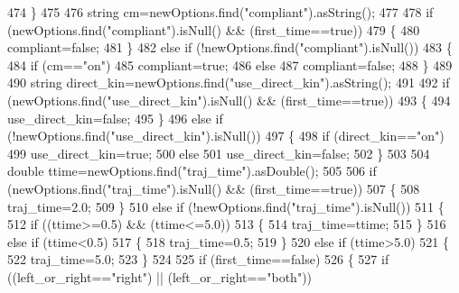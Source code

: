 \begin{DoxyCode}
474     \}
475 
476     \textcolor{keywordtype}{string} cm=newOptions.find(\textcolor{stringliteral}{"compliant"}).asString();
477 
478     \textcolor{keywordflow}{if} (newOptions.find(\textcolor{stringliteral}{"compliant"}).isNull() && (first\_time==\textcolor{keyword}{true}))
479     \{
480         compliant=\textcolor{keyword}{false};
481     \}
482     \textcolor{keywordflow}{else} \textcolor{keywordflow}{if} (!newOptions.find(\textcolor{stringliteral}{"compliant"}).isNull())
483     \{
484         \textcolor{keywordflow}{if} (cm==\textcolor{stringliteral}{"on"})
485             compliant=\textcolor{keyword}{true};
486         \textcolor{keywordflow}{else}
487             compliant=\textcolor{keyword}{false};
488     \}
489 
490     \textcolor{keywordtype}{string} direct\_kin=newOptions.find(\textcolor{stringliteral}{"use\_direct\_kin"}).asString();
491 
492     \textcolor{keywordflow}{if} (newOptions.find(\textcolor{stringliteral}{"use\_direct\_kin"}).isNull() && (first\_time==\textcolor{keyword}{true}))
493     \{
494         use_direct_kin=\textcolor{keyword}{false};
495     \}
496     \textcolor{keywordflow}{else} \textcolor{keywordflow}{if} (!newOptions.find(\textcolor{stringliteral}{"use\_direct\_kin"}).isNull())
497     \{
498         \textcolor{keywordflow}{if} (direct\_kin==\textcolor{stringliteral}{"on"})
499             use_direct_kin=\textcolor{keyword}{true};
500         \textcolor{keywordflow}{else}
501             use_direct_kin=\textcolor{keyword}{false};
502     \}
503 
504     \textcolor{keywordtype}{double} ttime=newOptions.find(\textcolor{stringliteral}{"traj\_time"}).asDouble();
505 
506     \textcolor{keywordflow}{if} (newOptions.find(\textcolor{stringliteral}{"traj\_time"}).isNull() && (first\_time==\textcolor{keyword}{true}))
507     \{
508         traj_time=2.0;
509     \}
510     \textcolor{keywordflow}{else} \textcolor{keywordflow}{if} (!newOptions.find(\textcolor{stringliteral}{"traj\_time"}).isNull())
511     \{
512         \textcolor{keywordflow}{if} ((ttime>=0.5) && (ttime<=5.0))
513         \{
514             traj_time=ttime;
515         \}
516         \textcolor{keywordflow}{else} \textcolor{keywordflow}{if} (ttime<0.5)
517         \{
518             traj_time=0.5;
519         \}
520         \textcolor{keywordflow}{else} \textcolor{keywordflow}{if} (ttime>5.0)
521         \{
522             traj_time=5.0;
523         \}
524 
525         \textcolor{keywordflow}{if} (first\_time==\textcolor{keyword}{false})
526         \{
527             \textcolor{keywordflow}{if} ((left_or_right==\textcolor{stringliteral}{"right"}) || (left_or_right==\textcolor{stringliteral}{"both"}))

\end{DoxyCode}
